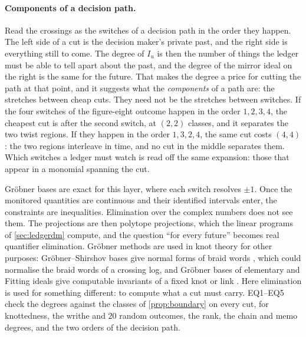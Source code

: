 \documentclass[11pt]{article}
\theoremstyle{definition}\newtheorem{definition}[theorem]{Definition}\newtheorem{remark}[theorem]{Remark}\newtheorem{example}[theorem]{Example}\newtheorem{problem}[theorem]{Open problem}\crefname{problem}{Problem}{Problems}
\begin{document}
\paragraph{Components of a decision path.} Read the crossings as the switches of a decision path in the order they happen. The left side of a cut is the decision maker's private past, and the right side is everything still to come. The degree of $I_u$ is then the number of things the ledger must be able to tell apart about the past, and the degree of the mirror ideal on the right is the same for the future. That makes the degree a price for cutting the path at that point, and it suggests what the \emph{components} of a path are: the stretches between cheap cuts. They need not be the stretches between switches. If the four switches of the figure-eight outcome happen in the order $1,2,3,4$, the cheapest cut is after the second switch, at $(2,2)$ classes, and it separates the two twist regions. If they happen in the order $1,3,2,4$, the same cut costs $(4,4)$: the two regions interleave in time, and no cut in the middle separates them. Which switches a ledger must watch is read off the same expansion: those that appear in a monomial spanning the cut.

Gr\"obner bases are exact for this layer, where each switch resolves $\pm1$. Once the monitored quantities are continuous and their identified intervals enter, the constraints are inequalities. Elimination over the complex numbers does not see them. The projections are then polytope projections, which the linear programs of \cref{sec:ledgerdm} compute, and the question ``for every future'' becomes real quantifier elimination. Gr\"obner methods are used in knot theory for other purposes: Gr\"obner--Shirshov bases give normal forms of braid words \cite{BokutChen2014,Bokut2008}, which could normalise the braid words of a crossing log, and Gr\"obner bases of elementary and Fitting ideals give computable invariants of a fixed knot or link \cite{CransHenrichNelson2013,NosakaShimizu2026}. Here elimination is used for something different: to compute what a cut must carry. EQ1--EQ5 check the degrees against the classes of \cref{prop:boundary} on every cut, for knottedness, the writhe and $20$ random outcomes, the rank, the chain and memo degrees, and the two orders of the decision path.
\end{document}
